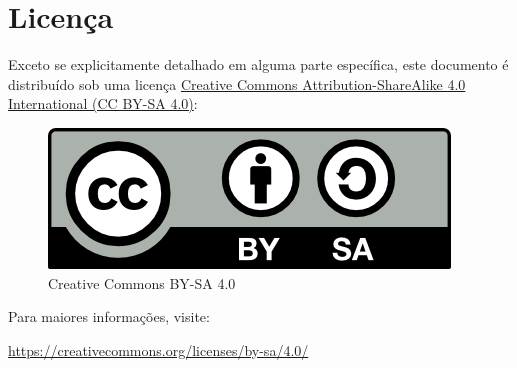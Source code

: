 \section{Licença}
\label{sec:license}

Exceto se explicitamente detalhado em alguma parte específica, este documento
é distribuído sob uma licença
\href{https://creativecommons.org/licenses/by-sa/4.0/}{Creative Commons Attribution-ShareAlike 4.0 International (CC BY-SA 4.0)}:

\begin{figure}[H]
  \centering
  \caption{Creative Commons BY-SA 4.0}
  \label{fig:cc}
     \includegraphics[scale=1]{imagens/cc-by-sa.png}
\end{figure}

Para maiores informações, visite:

\href{https://creativecommons.org/licenses/by-sa/4.0/}{https://creativecommons.org/licenses/by-sa/4.0/}
